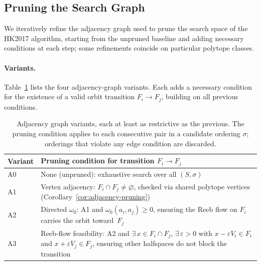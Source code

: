 %
%

\subsection{Pruning the Search Graph}
\label{sec:ablation-pruning}

We iteratively refine the adjacency graph used to prune the search space
of the HK2017 algorithm, starting from the unpruned baseline and adding
necessary conditions at each step; some refinements coincide on particular
polytope classes.

\paragraph{Variants.}
Table~\ref{tab:ablation-variants} lists the four adjacency-graph variants.
Each adds a necessary condition for the existence of a valid orbit transition
$F_i \to F_j$, building on all previous conditions.

\begin{table}[h]
\centering
\begin{tabular}{lp{9cm}}
\toprule
Variant & Pruning condition for transition $F_i \to F_j$ \\
\midrule
A0 & None (unpruned): exhaustive search over all $(S, \sigma)$ \\
A1 & Vertex adjacency: $F_i \cap F_j \neq \varnothing$, checked via shared polytope vertices (Corollary~\ref{cor:adjacency-pruning}) \\
A2 & Directed $\omega_0$: A1 and $\omega_0(a_i, a_j) \ge 0$, ensuring the Reeb flow on $F_i$ carries the orbit toward~$F_j$ \\
A3 & Reeb-flow feasibility: A2 and $\exists\, x \in F_i \cap F_j$, $\exists\,\varepsilon>0$ with $x - \varepsilon V_i \in F_i$ and $x + \varepsilon V_j \in F_j$, ensuring other halfspaces do not block the transition \\
\bottomrule
\end{tabular}
\caption{Adjacency graph variants, each at least as restrictive as the previous.
  The pruning condition applies to each consecutive pair in a candidate ordering
  $\sigma$; orderings that violate any edge condition are discarded.}
\label{tab:ablation-variants}
\end{table}


